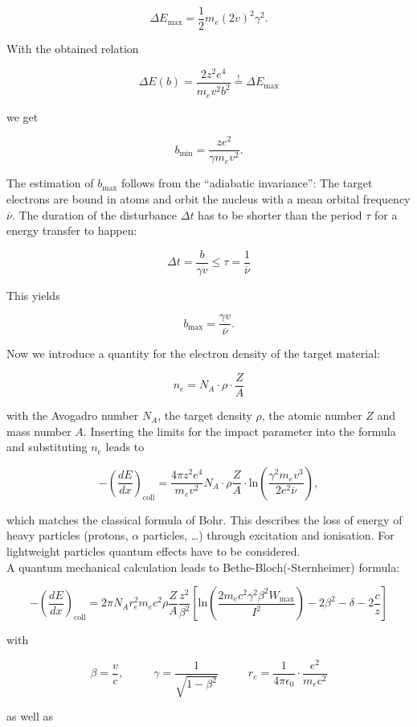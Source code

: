\[\Delta E_{\text{max}}=\frac{1}{2}m_e(2v)^2\gamma^2.\]

With the obtained relation 

\[\Delta E(b)=\frac{2z^2e^4}{m_ev^2b^2}\overset{!}{=}\Delta E_{\text{max}}\] 

we get

\[b_{\text{min}}=\frac{ze^2}{\gamma m_e v^2}.\]

The estimation of $b_{\text{max}}$ follows from the ``adiabatic invariance'': The target electrons
are bound in atoms and orbit the nucleus with a mean orbital frequency $\overline{\nu}$. The
duration of the disturbance $\Delta t$ has to be shorter than the period $\tau$ for a energy
transfer to happen: 

\[\Delta t=\frac{b}{\gamma v} \le \tau =\frac{1}{\overline{\nu}}\]

This yields 

\[b_{\text{max}}=\frac{\gamma v}{\overline{\nu}}.\]

Now we introduce a quantity for the electron density of the target material:

\[n_e=N_A\cdot \rho\cdot \frac{Z}{A}\]

with the Avogadro number $N_A$, the target density $\rho$, the atomic number $Z$ and mass number
$A$. Inserting the limits for the impact parameter into the formula and substituting $n_e$ leads to 

\[-\left(\frac{dE}{dx}\right)_{\text{coll}} = \frac{4\pi z^2e^4}{m_ev^2}N_A\cdot \rho
\frac{Z}{A}\cdot\text{ln}\left(\frac{\gamma^2 m_e v^3}{2e^2\overline{\nu}}\right), \]

which matches the classical formula of Bohr. This describes the loss of energy of heavy particles
(protons, $\alpha$ particles, \ldots) through excitation and ionisation. For lightweight particles
quantum effects have to be considered.
\\
A quantum mechanical calculation leads to Bethe-Bloch(-Sternheimer) formula:

\[-\left(\frac{dE}{dx}\right)_{\text{coll}} = 2\pi N_A r_e^2 m_e c^2 \rho \frac{Z}{A}
\frac{z^2}{\beta^2}\left[ \text{ln} \left( \frac{2m_e c^2 \gamma^2 \beta^2 W_{\text{max}}}{I^2}
\right) -2\beta^2 -\delta -2\frac{c}{z} \right]\]

with

\[\beta =
\frac{v}{c},~~~~~~~~~~~~\gamma=\frac{1}{\sqrt{1-\beta^2}}~~~~~~~~~~~~
r_e=\frac{1}{4\pi\epsilon_0}\cdot\frac{e^2}{m_e c^2}\]

as well as


